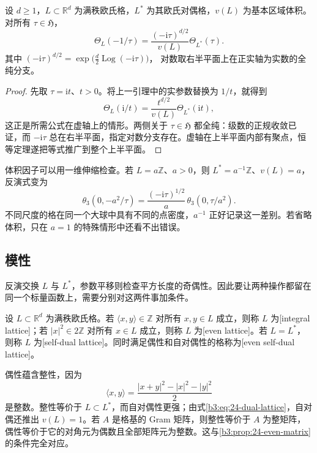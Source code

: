 \begin{theorem}\label{b3:thm:24-lattice-inversion}
设 \(d\ge1\)，\(L\subset\mathbb R^d\) 为满秩欧氏格，\(L^*\) 为其欧氏对偶格，\(v(L)\) 为基本区域体积。对所有 \(\tau\in\mathfrak H\)，
\begin{equation}\label{b3:eq:24-lattice-inversion}
 \Theta_L(-1/\tau)
 =\frac{(-\mathrm{i}\tau)^{d/2}}{v(L)}\Theta_{L^*}(\tau).
\end{equation}
其中
\((-\mathrm{i}\tau)^{d/2}=\exp\bigl(\tfrac d2\operatorname{Log}(-\mathrm{i}\tau)\bigr)\)，
对数取右半平面上在正实轴为实数的全纯分支。
\end{theorem}
\begin{proof}
先取 \(\tau=\mathrm{i}t\)、\(t>0\)。将上一引理中的实参数替换为 \(1/t\)，就得到
\[
 \Theta_L(\mathrm{i}/t)=\frac{t^{d/2}}{v(L)}\Theta_{L^*}(\mathrm{i}t),
\]
这正是所需公式在虚轴上的情形。两侧关于 \(\tau\in\mathfrak H\) 都全纯：级数的正规收敛已证，而 \(-\mathrm{i}\tau\) 总在右半平面，指定对数分支存在。虚轴在上半平面内部有聚点，恒等定理遂把等式推广到整个上半平面。
\end{proof}

体积因子可以用一维伸缩检查。若 \(L=a\mathbb Z\)、\(a>0\)，则
\(L^*=a^{-1}\mathbb Z\)、\(v(L)=a\)，反演式变为
\[
 \theta_3(0,-a^2/\tau)
 =\frac{(-\mathrm{i}\tau)^{1/2}}{a}\,
       \theta_3(0,\tau/a^2).
\]
不同尺度的格在同一个大球中具有不同的点密度，\(a^{-1}\) 正好记录这一差别。若省略体积，只在 \(a=1\) 的特殊情形中还看不出错误。

\subsection{模性}
\label{b3:subsec:240503}

反演交换 \(L\) 与 \(L^*\)，参数平移则检查平方长度的奇偶性。因此要让两种操作都留在同一个标量函数上，需要分别对这两件事加条件。

\begin{definition}[整性、偶性与自对偶性]\label{b3:def:24-even-self-dual}
设 \(L\subset\mathbb R^d\) 为满秩欧氏格。若
\(\langle x,y\rangle\in\mathbb Z\) 对所有 \(x,y\in L\) 成立，则称 \(L\) 为[integral lattice]；若
\(|x|^2\in2\mathbb Z\) 对所有 \(x\in L\) 成立，则称 \(L\) 为[even lattice]。若 \(L=L^*\)，则称 \(L\) 为[self-dual lattice]。同时满足偶性和自对偶性的格称为[even self-dual lattice]。
\end{definition}

偶性蕴含整性，因为
\[
 \langle x,y\rangle=\frac{|x+y|^2-|x|^2-|y|^2}{2}
\]
是整数。整性等价于 \(L\subset L^*\)，而自对偶性更强；由式\eqref{b3:eq:24-dual-lattice}，自对偶还推出 \(v(L)=1\)。若 \(A\) 是格基的 Gram 矩阵，则整性等价于 \(A\) 为整矩阵，偶性等价于它的对角元为偶数且全部矩阵元为整数。这与\cref{b3:prop:24-even-matrix}的条件完全对应。

